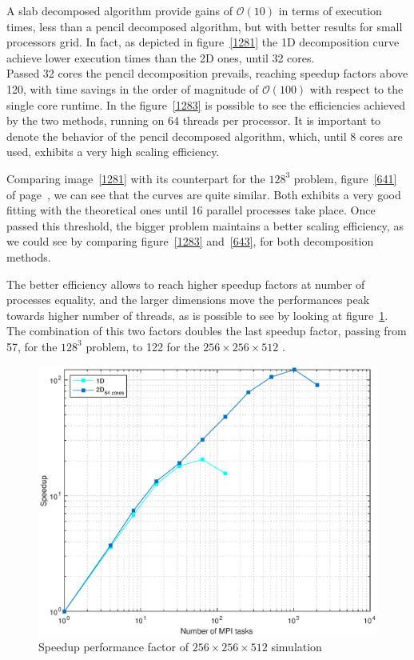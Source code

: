 A slab decomposed algorithm provide gains of $\mathcal{O}(10)$ in terms of execution times, less than a pencil decomposed algorithm, but with better results for small processors grid. In fact, as depicted in figure~\ref{1281} the 1D decomposition curve achieve lower execution times than the 2D ones, until 32 cores.\\
Passed 32 cores the pencil decomposition prevails, reaching speedup factors above 120, with time savings in the order of magnitude of $\mathcal{O}(100)$ with respect to the single core runtime.
In the figure~\ref{1283} is possible to see the efficiencies achieved by the two methods, running on 64 threads per processor. It is important to denote the behavior of the pencil decomposed algorithm, which, until 8 cores are used, exhibits a very high scaling efficiency. 
\par
Comparing image~\ref{1281} with its counterpart for the $128^{3}$ problem, figure~\ref{641} of page~\pageref{641}, we can see that the curves are quite similar. Both exhibits a very good fitting with the theoretical ones until 16 parallel processes take place. Once passed this threshold, the bigger problem maintains a better scaling efficiency, as we could see by comparing figure~\ref{1283} and~\ref{643}, for both decomposition methods. \par
The better efficiency allows to reach higher speedup factors at number of processes equality, and the larger dimensions move the performances peak towards higher number of threads, as is possible to see by looking at figure~\ref{1282}. The combination of this two factors doubles the last speedup factor, passing from 57, for the $128^{3}$ problem, to 122 for the $256\times 256\times 512$ .

\begin{figure}
\begin{center}
\includegraphics[scale=0.55]{grafici/1282}
\caption{Speedup performance factor of $256\times 256\times 512$  simulation}
\label{1282}
\end{center}
\end{figure}

